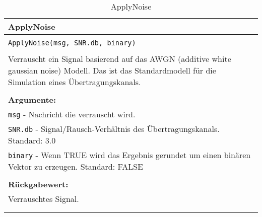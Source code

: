 \begin{longtable}{|p{\textwidth}|}
\hline
\rowcolor{lightblue}
ApplyNoise\\
\hline
\\
\texttt{ApplyNoise(msg, SNR.db, binary)}\\
\\
Verrauscht ein Signal basierend auf das AWGN (additive white gaussian noise) Modell. Das ist das Standardmodell für die Simulation eines Übertragungskanals.\\
\\
\textbf{Argumente:}\\
\texttt{msg} - Nachricht die verrauscht wird.\\
\texttt{SNR.db} - Signal/Rausch-Verhältnis des Übertragungskanals. Standard: 3.0\\
\texttt{binary} - Wenn TRUE wird das Ergebnis gerundet um einen binären Vektor zu erzeugen. Standard: FALSE\\
\\
\textbf{Rückgabewert:}\\
Verrauschtes Signal.\\
\\
\hline
\caption{ApplyNoise}
\label{func:applynoise}
\end{longtable}